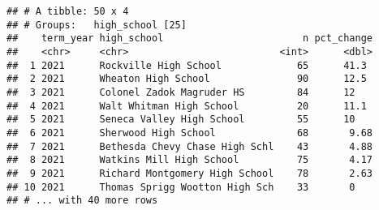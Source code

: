 \documentclass[]{article}
\newenvironment{Shaded}{\begin{snugshade}}{\end{snugshade}}
\newcommand{\CommentTok}[1]{\textcolor[rgb]{0.56,0.35,0.01}{\textit{#1}}}
\newcommand{\DataTypeTok}[1]{\textcolor[rgb]{0.13,0.29,0.53}{#1}}
\newcommand{\DecValTok}[1]{\textcolor[rgb]{0.00,0.00,0.81}{#1}}
\newcommand{\KeywordTok}[1]{\textcolor[rgb]{0.13,0.29,0.53}{\textbf{#1}}}
\newcommand{\NormalTok}[1]{#1}
\newcommand{\OperatorTok}[1]{\textcolor[rgb]{0.81,0.36,0.00}{\textbf{#1}}}
\newcommand{\OtherTok}[1]{\textcolor[rgb]{0.56,0.35,0.01}{#1}}
\newcommand{\StringTok}[1]{\textcolor[rgb]{0.31,0.60,0.02}{#1}}
\begin{document}
\begin{Shaded}
\end{Shaded}

\begin{verbatim}
## # A tibble: 50 x 4
## # Groups:   high_school [25]
##    term_year high_school                        n pct_change
##    <chr>     <chr>                          <int>      <dbl>
##  1 2021      Rockville High School             65      41.3 
##  2 2021      Wheaton High School               90      12.5 
##  3 2021      Colonel Zadok Magruder HS         84      12   
##  4 2021      Walt Whitman High School          20      11.1 
##  5 2021      Seneca Valley High School         55      10   
##  6 2021      Sherwood High School              68       9.68
##  7 2021      Bethesda Chevy Chase High Schl    43       4.88
##  8 2021      Watkins Mill High School          75       4.17
##  9 2021      Richard Montgomery High School    78       2.63
## 10 2021      Thomas Sprigg Wootton High Sch    33       0   
## # ... with 40 more rows
\end{verbatim}
\end{document}
